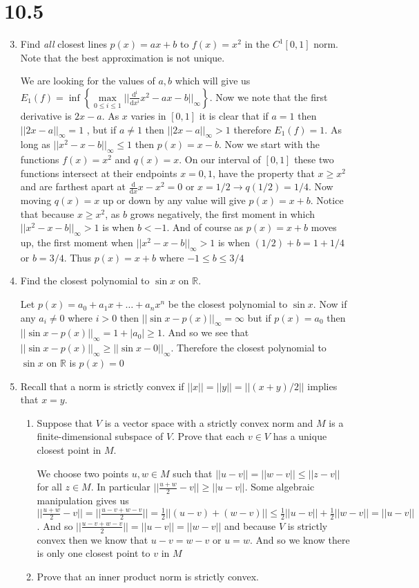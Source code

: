 \documentclass[letterpaper]{article}
\begin{document}
\section*{10.5}
\begin{enumerate}
\setcounter{enumi}{2}
\item
Find \emph{all} closest lines $p(x)=ax+b$ to $f(x)=x^2$ in the $C^1[0,1]$ norm.
Note that the best approximation is not unique.

We are looking for the values of $a,b$ which will give us
$E_1(f)=\inf\left\{\max\limits_{0\le i\le  1}
||\frac{\mathrm{d^i}}{\mathrm{d}x^i} x^2-ax-b||_\infty\right\}$.
Now we note that the first derivative is $2x-a$.  As $x$ varies in $[0,1]$ it
is clear that if $a=1$ then $||2x-a||_\infty=1$ , but if $a\ne 1$ then
$||2x-a||_\infty>1$ therefore $E_1(f)=1$. As long as $||x^2-x-b||_\infty\le 1$ then $p(x)=x-b$. Now we start with the functions $f(x)=x^2$ and $q(x)=x$. On our interval of $[0,1]$ these two functions intersect at their endpoints $x=0,1$, have the property that $x\ge x^2$ and are farthest apart at $\frac{\mathrm{d}}{\mathrm{d}x}x-x^2=0$ or $x=1/2\to q(1/2)=1/4$. Now moving $q(x)=x$ up or down by any value will give $p(x)=x+b$. Notice that because $x\ge x^2$, as $b$ grows negatively, the first moment in which $||x^2-x-b||_\infty>1$ is when $b<-1$. And of course as $p(x)=x+b$ moves up, the first moment when $||x^2-x-b||_\infty>1$ is when $(1/2)+b=1+1/4$ or $b=3/4$. Thus $p(x)=x+b$ where $-1\le b\le 3/4$
\item
Find the closest polynomial to $\sin x$ on $\mathbb{R}$.

Let $p(x)=a_0+a_1x+\dots+a_nx^n$ be the closest polynomial to $\sin x$. Now if any $a_i\ne 0$ where $i>0$ then $||\sin x-p(x)||_\infty=\infty$ but if $p(x)=a_0$ then $||\sin x-p(x)||_\infty=1+|a_0|\ge 1$. And so we see that $||\sin x-p(x)||_\infty\ge ||\sin x-0||_\infty$. Therefore the closest polynomial to $\sin x$ on $\mathbb{R}$ is $p(x)=0$
\setcounter{enumi}{6}
\item
Recall that a norm is strictly convex if $||x||=||y||=||(x+y)/2||$ implies that $x=y$.
  \begin{enumerate}
  \item
  Suppose that $V$ is a vector space with a strictly convex norm and $M$ is a finite-dimensional subspace of $V$. Prove that each $v\in V$ has a unique closest point in $M$.

  We choose two points $u,w\in M$ such that $||u-v||=||w-v||\le||z-v||$ for all $z\in M$. In particular $||\frac{u+w}{2}-v||\ge ||u-v||$. Some algebraic manipulation gives us $||\frac{u+w}{2}-v||=||\frac{u-v+w-v}{2}||=\frac{1}{2}||(u-v)+(w-v)||\le \frac{1}{2}||u-v||+\frac{1}{2}||w-v||=||u-v||$. And so $||\frac{u-v+w-v}{2}||=||u-v||=||w-v||$ and because $V$ is strictly convex then we know that $u-v=w-v$ or $u=w$. And so we know there is only one closest point to $v$ in $M$ 
  \item
  Prove that an inner product norm is strictly convex.


\end{enumerate}
\end{enumerate}
\end{document}
